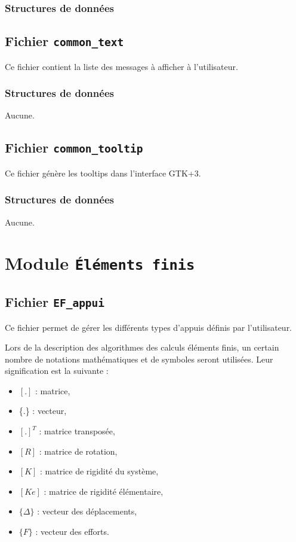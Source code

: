 \documentclass{article}
\begin{document}
\subsubsection{Structures de données}


\subsection{Fichier {\texttt{common\_text}}}
Ce fichier contient la liste des messages à afficher à l'utilisateur.
\subsubsection{Structures de données}
Aucune.

\subsection{Fichier {\texttt{common\_tooltip}}}
Ce fichier génère les tooltips dans l'interface GTK+3.
\subsubsection{Structures de données}
Aucune.

\section{Module {\texttt{Éléments finis}}}
\subsection{Fichier {\texttt{EF\_appui}}}
Ce fichier permet de gérer les différents types d'appuis définis par l'utilisateur.\par
Lors de la description des algorithmes des calculs éléments finis, un certain nombre de notations mathématiques et de symboles seront utilisées. Leur signification est la suivante :
\begin{itemize}
\item $[.]$ : matrice,
\item \{.\} : vecteur,
\item $[.]^T$ : matrice transposée,
\item $[R]$ : matrice de rotation,
\item $[K]$ : matrice de rigidité du système,
\item $[Ke]$ : matrice de rigidité élémentaire,
\item $\{\Delta\}$ : vecteur des déplacements,
\item $\{F\}$ : vecteur des efforts.
\end{itemize}
\end{document}
